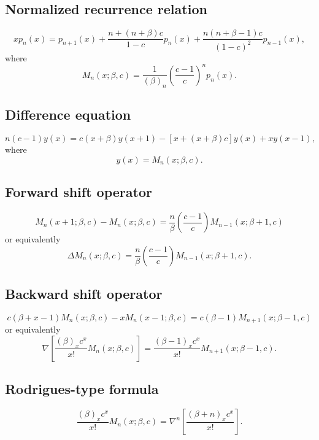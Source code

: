 \documentclass[envcountchap,graybox]{svmono}
\begin{document}
\subsection*{Normalized recurrence relation}
\begin{equation}
\label{NormRecMeixner}
xp_n(x)=p_{n+1}(x)+\frac{n+(n+\beta)c}{1-c}p_n(x)+
\frac{n(n+\beta-1)c}{(1-c)^2}p_{n-1}(x),
\end{equation}
where
$$M_n(x;\beta,c)=\frac{1}{(\beta)_n}\left(\frac{c-1}{c}\right)^np_n(x).$$

\subsection*{Difference equation}
\begin{equation}
\label{dvMeixner}
n(c-1)y(x)=c(x+\beta)y(x+1)-\left[x+(x+\beta)c\right]y(x)+xy(x-1),
\end{equation}
where
$$y(x)=M_n(x;\beta,c).$$

\subsection*{Forward shift operator}
\begin{equation}
\label{shift1MeixnerI}
M_n(x+1;\beta,c)-M_n(x;\beta,c)=
\frac{n}{\beta}\left(\frac{c-1}{c}\right)M_{n-1}(x;\beta+1,c)
\end{equation}
or equivalently
\begin{equation}
\label{shift1MeixnerII}
\Delta M_n(x;\beta,c)=\frac{n}{\beta}\left(\frac{c-1}{c}\right)M_{n-1}(x;\beta+1,c).
\end{equation}

\subsection*{Backward shift operator}
\begin{equation}
\label{shift2MeixnerI}
c(\beta+x-1)M_n(x;\beta,c)-xM_n(x-1;\beta,c)=c(\beta-1)M_{n+1}(x;\beta-1,c)
\end{equation}
or equivalently
\begin{equation}
\label{shift2MeixnerII}
\nabla\left[\frac{(\beta)_xc^x}{x!}M_n(x;\beta,c)\right]=
\frac{(\beta-1)_xc^x}{x!}M_{n+1}(x;\beta-1,c).
\end{equation}

\subsection*{Rodrigues-type formula}
\begin{equation}
\label{RodMeixner}
\frac{(\beta)_xc^x}{x!}M_n(x;\beta,c)=\nabla^n\left[\frac{(\beta+n)_xc^x}{x!}\right].
\end{equation}
\end{document}
